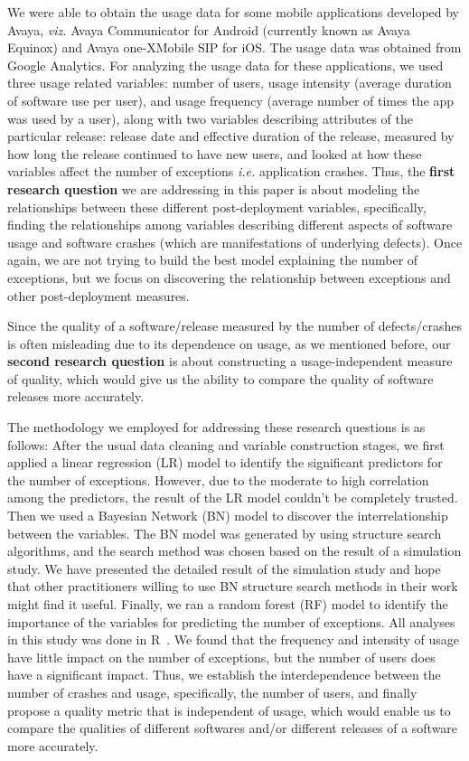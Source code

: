 \documentclass[smallcondensed]{svjour3}     %
\begin{document}
We were able to obtain the usage data for some mobile applications developed by Avaya, \textit{viz.}  Avaya Communicator for Android (currently known as Avaya Equinox\textregistered) and Avaya one-X\textregistered  Mobile SIP for iOS. The usage data was obtained from Google Analytics. 
For analyzing the usage data for these applications, we used three usage related variables: number of users, 
usage intensity (average duration of software use per user), and usage frequency 
(average number of times the app was used by a user), along with two variables describing attributes 
of the particular release: release date and effective duration of the release, measured by how 
long the release continued to have new users, and looked at how these variables affect 
the number of exceptions \textit{i.e.} application crashes.  Thus, the \textbf{first research question} we are addressing in this paper is about modeling the relationships between these different post-deployment variables, specifically, finding the relationships among variables describing different aspects of software
usage and software crashes (which are manifestations of underlying defects). Once again, we are not trying to build the best model explaining the number of exceptions, but we focus on discovering the relationship between exceptions and other post-deployment measures.

Since the quality of a software/release measured by the number of defects/crashes is often misleading due to its dependence on usage, as we mentioned before, our \textbf{second research question} is about constructing a usage-independent measure of quality, which would give us the ability to compare the quality of software releases more accurately.


The methodology we employed for addressing these research questions is as follows: After the usual data cleaning and variable construction stages, we first applied a linear regression (LR) model to identify the significant predictors for the number of exceptions. However, due to the moderate to high correlation among the predictors, the result of the LR model couldn't be completely trusted. Then we used a Bayesian Network (BN) model to discover the interrelationship between the variables. The BN model was generated by using structure search algorithms, and the search method was chosen based on the result of a simulation study. We have presented the detailed result of the simulation study and hope that other practitioners willing to use BN structure search methods in their work might find it useful.  Finally, we ran a random forest (RF) model to identify the importance of the variables for predicting the number of exceptions. All analyses in this study was done in R~\cite{R}. We found that the frequency and intensity of usage have little impact on the number of exceptions, but the number of users does have a significant impact. Thus, we establish the interdependence between the number of crashes and usage, specifically, the number of users, and finally propose a quality metric that is independent of usage, which would enable us to compare the qualities of different softwares and/or different releases of a software more accurately. 
\end{document}
